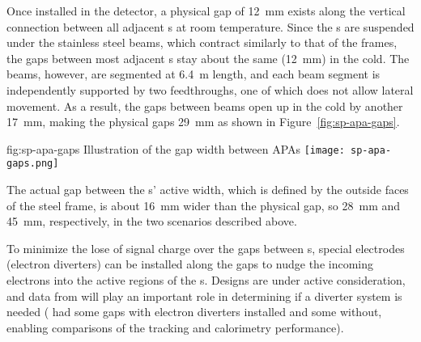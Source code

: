 

Once installed in the detector, a physical gap of \SI{12}{mm} exists along the vertical connection between all adjacent s at room temperature. Since the s are suspended under the stainless steel  beams, which contract similarly to that of the  frames, the gaps between most adjacent s stay about the same (\SI{12}{mm}) in the cold.  The  beams, however, are segmented at \SI{6.4}{m} length, and each beam segment is independently supported by two  feedthroughs, one of which does not allow lateral movement.  As a result, the gaps between  beams open up in the cold by another \SI{17}{mm},  %
making the physical gaps \SI{29}{mm} as shown in Figure~\ref{fig:sp-apa-gaps}.

\begin{dunefigure}{fig:sp-apa-gaps}
{Illustration of the gap width between APAs}  
\texttt{[image: sp-apa-gaps.png]} 
\end{dunefigure}

The actual gap between the s' active width, which is defined by the outside faces of the steel frame, is about \SI{16}{mm} wider than the physical gap, so \SI{28}{mm} and \SI{45}{mm}, respectively, in the two scenarios described above.

To minimize the lose of signal charge over the gaps between s, special electrodes (electron diverters) can be installed along the gaps to nudge the incoming electrons into the active regions of the s.  Designs are under active consideration, and data from  will play an important role in determining if a diverter system is needed ( had some  gaps with electron diverters installed and some without, enabling comparisons of the tracking and calorimetry performance).

